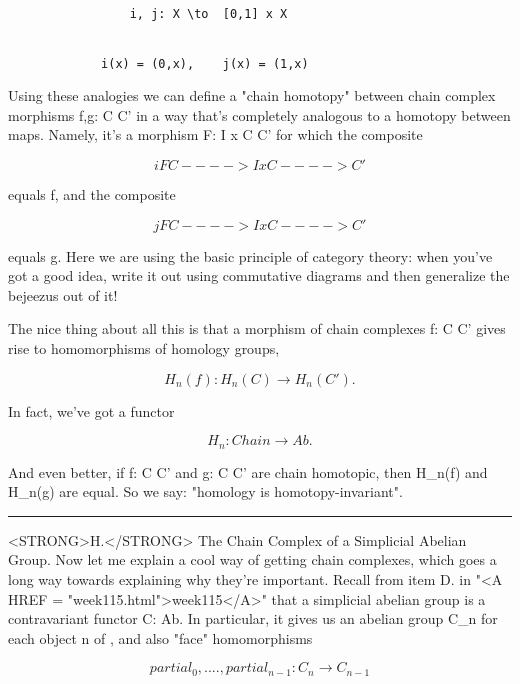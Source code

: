 \begin{verbatim}

                 i, j: X \to  [0,1] x X         
              

             i(x) = (0,x),    j(x) = (1,x) 
\end{verbatim}
    
Using these analogies we can define a "chain homotopy" between chain
complex morphisms f,g: C \to  C' in a way that's completely analogous to a
homotopy between maps.  Namely, it's a morphism F: I x C \to  C' for which
the composite


$$

                    i           F
                C ----> I x C ----> C'
$$
    
equals f, and the composite


$$

                    j           F
                C ----> I x C ----> C'
$$
    
equals g.   Here we are using the basic principle of category theory:
when you've got a good idea, write it out using commutative diagrams
and then generalize the bejeezus out of it!  

The nice thing about all this is that a morphism of chain complexes
f: C \to  C' gives rise to homomorphisms of homology groups, 
 

$$

                H_{n}(f): H_{n}(C) \to  H_{n}(C').
$$
    
In fact, we've got a functor

$$

                H_{n}: Chain \to  Ab.
$$
    
And even better, if f: C \to  C' and g: C \to  C' are chain homotopic, then
H_{n}(f) and H_{n}(g) are equal.  So we say: "homology is homotopy-invariant".

\par\noindent\rule{\textwidth}{0.4pt}
<STRONG>H.</STRONG> The Chain Complex of a Simplicial Abelian Group.
Now let me explain a cool way of getting chain complexes, which goes a
long way towards explaining why they're important.  Recall from item
D. in "<A HREF = "week115.html">week115</A>" that a
simplicial abelian group is a contravariant functor C: \Delta  \to 
Ab.  In particular, it gives us an abelian group C_{n} for
each object n of \Delta , and also "face" homomorphisms


$$

         partial_{0}, ...., partial_{n-1}: C_{n} \to  C_{n-1}
$$
    
